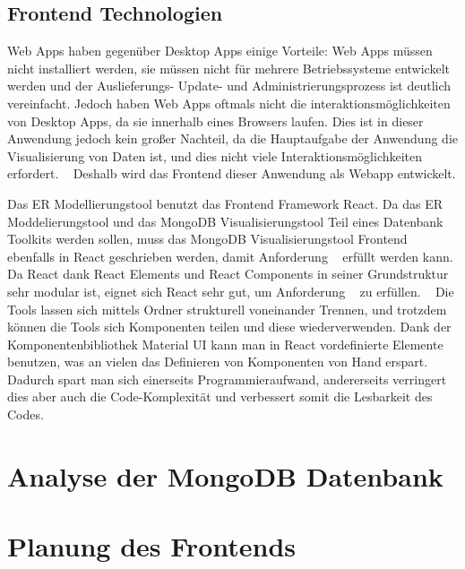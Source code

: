 \subsection{Frontend Technologien}
\label{sec:verwendete_technologien_frontend}

Web Apps haben gegenüber Desktop Apps einige Vorteile:
Web Apps müssen nicht installiert werden, sie müssen nicht für mehrere Betriebssysteme entwickelt werden und der Auslieferungs- Update- und Administrierungsprozess ist deutlich vereinfacht.
Jedoch haben Web Apps oftmals nicht die interaktionsmöglichkeiten von Desktop Apps, da sie innerhalb eines Browsers laufen.
Dies ist in dieser Anwendung jedoch kein großer Nachteil, da die Hauptaufgabe der Anwendung die Visualisierung von Daten ist, und dies nicht viele Interaktionsmöglichkeiten erfordert.
~\autocite{zepeda2007desktop}
Deshalb wird das Frontend dieser Anwendung als Webapp entwickelt.

Das ER Modellierungstool benutzt das Frontend Framework React.
Da das ER Moddelierungstool und das MongoDB Visualisierungstool Teil eines Datenbank Toolkits werden sollen, muss das MongoDB Visualisierungstool Frontend ebenfalls in React geschrieben werden, damit Anforderung ~ erfüllt werden kann.
Da React dank React Elements und React Components in seiner Grundstruktur  sehr modular ist, eignet sich React sehr gut, um Anforderung ~ zu erfüllen.
~\autocite{banks:react}
Die Tools lassen sich mittels Ordner strukturell voneinander Trennen, und trotzdem können die Tools sich Komponenten teilen und diese wiederverwenden.
Dank der Komponentenbibliothek Material UI kann man in React vordefinierte Elemente benutzen, was an vielen das Definieren von Komponenten von Hand erspart.
Dadurch spart man sich einerseits Programmieraufwand, andererseits verringert dies aber auch die Code-Komplexität und verbessert somit die Lesbarkeit des Codes.
~\autocite{mui:mui}

\section{Analyse der MongoDB Datenbank}
\label{sec:mongoDB_analyse}

\section{Planung des Frontends}
\label{sec:planung_frontend}
